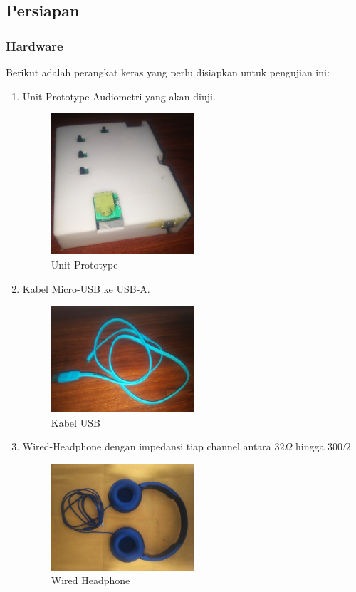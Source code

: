 \documentclass[12pt,]{article}
\begin{document}
	\subsection{Persiapan}
	
	\subsubsection{Hardware}
	
	Berikut adalah perangkat keras yang perlu disiapkan untuk pengujian ini:
	\begin{enumerate}
		\item Unit Prototype Audiometri yang akan diuji.
		\begin{figure}[!ht]
			\centering
			\includegraphics[width=150pt]{images/foto/unit}
			\caption{Unit Prototype}
		\end{figure}
	
		\item Kabel Micro-USB ke USB-A.
		\begin{figure}[!ht]
			\centering
			\includegraphics[width=150pt]{images/foto/kabel}
			\caption{Kabel USB}
		\end{figure}
	
		\item Wired-Headphone dengan impedansi tiap channel antara $32\Omega$ hingga $300\Omega$
		\begin{figure}[!ht]
			\centering
			\includegraphics[width=150pt]{images/foto/phone}
			\caption{Wired Headphone}
		\end{figure}
	

\end{enumerate}
\end{document}

